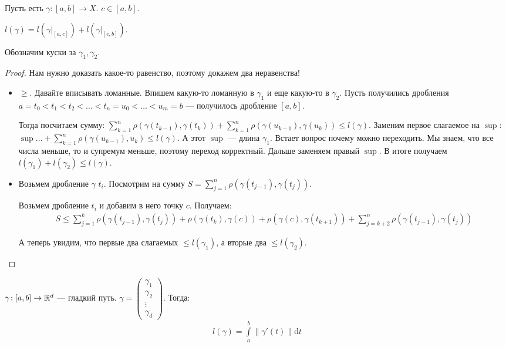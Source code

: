\begin{theorem}
    Пусть есть $\gamma\!: [a, b] \to X$.  $c \in [a, b]$. 

    $l(\gamma) = l(\gamma \Big|_{[a, c]}) + l(\gamma \Big|_{[c, b]})$.

    Обозначим куски за  $\gamma_1, \gamma_2$.
\end{theorem}
\begin{proof}
    Нам нужно доказать какое-то равенство, поэтому докажем два неравенства!
    \begin{itemize}
        \item $\ge$. Давайте вписывать ломанные. Впишем какую-то ломанную в $\gamma_1$ и еще какую-то в $\gamma_2$. Пусть получились дробления $a = t_0 < t_1 < t_2 < \ldots < t_n = u_0 < \ldots < u_m = b$ --- получилось дробление $[a, b]$.

            Тогда посчитаем сумму:  $\sum\limits_{k=1}^n \rho(\gamma(t_{k-1}), \gamma(t_k)) + \sum\limits_{k=1}^n \rho(\gamma(u_{k-1}), \gamma(u_k)) \le l(\gamma)$. Заменим первое слагаемое на $\sup$: $\sup \ldots + \sum\limits_{k=1}^n \rho(\gamma(u_{k-1}), u_k) \le l(\gamma)$. А этот $\sup$ --- длина  $\gamma_1$. Встает вопрос почему можно переходить. Мы знаем, что все числа меньше, то и супремум меньше, поэтому переход корректный. Дальше заменяем правый $\sup$. В итоге получаем  $l(\gamma_1) + l(\gamma_2) \le l(\gamma)$.
        \item Возьмем дробление $\gamma$  $t_i$. Посмотрим на сумму  $S = \sum\limits_{j=1}^n\rho(\gamma(t_{j-1}), \gamma(t_j))$. 

            Возьмем дробление $t_i$ и добавим в него точку  $c$. Получаем: 
             \begin{align*}
                S \le \sum_{j=1}^k \rho(\gamma(t_{j-1}), \gamma(t_j)) + \rho(\gamma(t_k), \gamma(c)) + \rho(\gamma(c), \gamma(t_{k+1})) + \sum_{j = k + 2}^n \rho(\gamma(t_{j-1}), \gamma(t_j))
            \end{align*}
            
            А теперь увидим, что первые два слагаемых $\le l(\gamma_1)$, а вторые два $\le l(\gamma_2)$.
    \end{itemize}
\end{proof}
\begin{theorem}
    $\gamma\!: [a,b] \to \mathbb{R}^d$ --- гладкий путь. $\gamma = \begin{pmatrix} \gamma_1 \\ \gamma_2 \\ \vdots \\ \gamma_d \end{pmatrix}$. Тогда: 
\begin{align*}
    l(\gamma) = \int\limits_a^b \| \gamma'(t) \| \mathrm{d}t
\end{align*}
\end{theorem}

